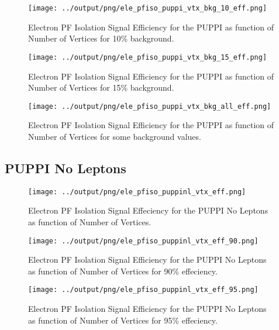 \documentclass[11pt]{book}
\begin{document}
\begin{figure}[htb]
\centering
\texttt{[image: ../output/png/ele\_pfiso\_puppi\_vtx\_bkg\_10\_eff.png]}
\caption{Electron PF Isolation Signal Efficiency for the PUPPI as function of Number of Vertices for 10\% background.}
\label{fig:ele_pfiso_vtx_eff_puppi_bkg_10_eff}
\end{figure}

\begin{figure}[htb]
\centering
\texttt{[image: ../output/png/ele\_pfiso\_puppi\_vtx\_bkg\_15\_eff.png]}
\caption{Electron PF Isolation Signal Efficiency for the PUPPI as function of Number of Vertices for 15\% background.}
\label{fig:ele_pfiso_vtx_eff_puppi_bkg_15_eff}
\end{figure}

\begin{figure}[htb]
\centering
\texttt{[image: ../output/png/ele\_pfiso\_puppi\_vtx\_bkg\_all\_eff.png]}
\caption{Electron PF Isolation Signal Efficiency for the PUPPI as function of Number of Vertices for some background values.}
\label{fig:ele_pfiso_vtx_eff_puppi_bkg_all_eff}
\end{figure}
\clearpage

\subsection{PUPPI No Leptons}
\begin{figure}[htb]
\centering
\texttt{[image: ../output/png/ele\_pfiso\_puppinl\_vtx\_eff.png]}
\caption{Electron PF Isolation Signal Effeciency for the PUPPI No Leptons as function of Number of Vertices.}
\label{fig:ele_pfiso_vtx_eff_puppinl}
\end{figure}

\begin{figure}[htb]
\centering
\texttt{[image: ../output/png/ele\_pfiso\_puppinl\_vtx\_eff\_90.png]}
\caption{Electron PF Isolation Signal Efficiency for the PUPPI No Leptons as function of Number of Vertices for 90\% effeciency.}
\label{fig:ele_pfiso_vtx_eff_puppinl_eff_90}
\end{figure}

\begin{figure}[htb]
\centering
\texttt{[image: ../output/png/ele\_pfiso\_puppinl\_vtx\_eff\_95.png]}
\caption{Electron PF Isolation Signal Efficiency for the PUPPI No Leptons as function of Number of Vertices for 95\% effeciency.}
\label{fig:ele_pfiso_vtx_eff_puppinl_eff_95}
\end{figure}
\end{document}
